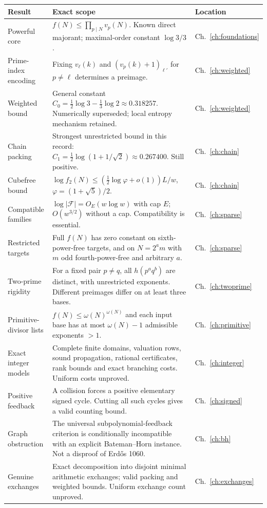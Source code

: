 \begin{longtable}{@{}p{}p{}p{}@{}}
\toprule
Result & Exact scope & Location\\\midrule\endhead
Powerful core & $f(N)\le\prod_{p\mid N}v_p(N)$. Known direct majorant; maximal-order constant $\log3/3$. & Ch.~\ref{ch:foundations}\\
Prime-index encoding & Fixing $v_\ell(k)$ and $(v_p(k)+1)_{\ell'}$ for $p\ne\ell$ determines a preimage. & Ch.~\ref{ch:weighted}\\
Weighted bound & General constant $C_0=\tfrac12\log3-\tfrac13\log2\approx0.318257$. Numerically superseded; local entropy mechanism retained. & Ch.~\ref{ch:weighted}\\
Chain packing & Strongest unrestricted bound in this record: $C_1=\tfrac12\log(1+1/\sqrt2)\approx0.267400$. Still positive. & Ch.~\ref{ch:chain}\\
Cubefree bound & $\log f_2(N)\le(\tfrac12\log\varphi+o(1))L/w$, $\varphi=(1+\sqrt5)/2$. & Ch.~\ref{ch:chain}\\
Compatible families & $\log|\mathcal F|=O_E(w\log w)$ with cap $E$; $O(w^{3/2})$ without a cap. Compatibility is essential. & Ch.~\ref{ch:sparse}\\
Restricted targets & Full $f(N)$ has zero constant on sixth-power-free targets, and on $N=2^a m$ with $m$ odd fourth-power-free and arbitrary $a$. & Ch.~\ref{ch:sparse}\\
Two-prime rigidity & For a fixed pair $p\ne q$, all $h(p^a q^b)$ are distinct, with unrestricted exponents. Different preimages differ on at least three bases. & Ch.~\ref{ch:twoprime}\\
Primitive-divisor lists & $f(N)\le\omega(N)^{\omega(N)}$ and each input base has at most $\omega(N)-1$ admissible exponents $>1$. & Ch.~\ref{ch:primitive}\\
Exact integer models & Complete finite domains, valuation rows, sound propagation, rational certificates, rank bounds and exact branching costs. Uniform costs unproved. & Ch.~\ref{ch:integer}\\
Positive feedback & A collision forces a positive elementary signed cycle. Cutting all such cycles gives a valid counting bound. & Ch.~\ref{ch:signed}\\
Graph obstruction & The universal subpolynomial-feedback criterion is conditionally incompatible with an explicit Bateman--Horn instance. Not a disproof of Erd\H{o}s 1060. & Ch.~\ref{ch:bh}\\
Genuine exchanges & Exact decomposition into disjoint minimal arithmetic exchanges; valid packing and weighted bounds. Uniform exchange count unproved. & Ch.~\ref{ch:exchanges}\\
\bottomrule
\end{longtable}
\normalsize

